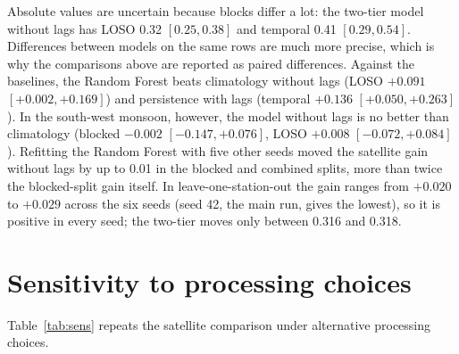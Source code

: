 Absolute \rsq{} values are uncertain because blocks differ a lot: the two-tier model without lags
has LOSO \rsq{} 0.32 $[0.25, 0.38]$ and temporal \rsq{} 0.41 $[0.29, 0.54]$. Differences between models
on the same rows are much more precise, which is why the comparisons above are reported as paired
differences. Against the baselines, the Random Forest beats climatology without lags (LOSO $+0.091$
$[+0.002, +0.169]$) and persistence with lags (temporal $+0.136$ $[+0.050, +0.263]$). In the
south-west monsoon, however, the model without lags is no better than climatology (blocked $-0.002$
$[-0.147, +0.076]$, LOSO $+0.008$ $[-0.072, +0.084]$). Refitting the Random Forest with five other
seeds moved the satellite gain without lags by up to 0.01 in the blocked and combined splits, more
than twice the blocked-split gain itself. In leave-one-station-out the gain ranges from $+0.020$ to
$+0.029$ across the six seeds (seed 42, the main run, gives the lowest), so it is positive in every
seed; the two-tier \rsq{} moves only between 0.316 and 0.318.

\section{Sensitivity to processing choices}\label{sec:sensitivity}

Table~\ref{tab:sens} repeats the satellite comparison under alternative processing choices.


